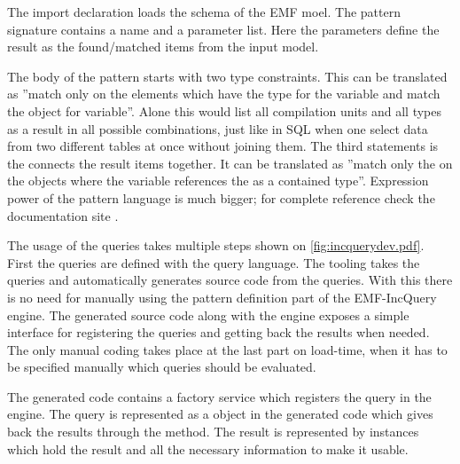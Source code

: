 The import declaration loads the schema of the EMF moel. The pattern signature
contains a name and a parameter list. Here the parameters define the result as
the found/matched items from the input model. 

The body of the pattern starts with two type constraints. This can be translated
as ''match only on the elements which have the  type for
the  variable and match the  object for 
variable''. Alone this would list all compilation units and all types as a
result in all possible combinations, just like in SQL when one select data from
two different tables at once without joining them. The third statements is the
connects the result items together. It can be translated as ''match only the on
the objects  where the  variable references the  as a contained
type''. Expression power of the pattern language is much bigger; for complete
reference check the documentation site \cite{EMFIncQuery}.

The usage of the queries takes multiple steps shown on \autoref{fig:incquerydev.pdf}.
First the queries are defined with the query language. The tooling takes the queries 
and automatically generates source code from the queries. With this there is no need 
for manually using the pattern definition part of the EMF-IncQuery engine. The generated
source code along with the engine exposes a simple interface for registering the
queries and getting back the results when needed. The only manual coding takes place
at the last part on load-time, when it has to be specified manually which queries 
should be evaluated. 
  
The generated code contains a factory service which registers the query in the
engine. The query is represented as a  object in the generated
code which gives back the results through the 
method. The result is represented by  instances which hold the result 
and all the necessary information to make it usable.

